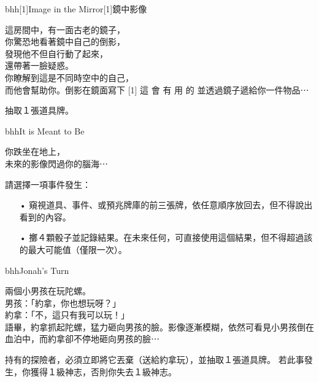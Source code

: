 \linebreak[0]%
\begin{EventCardSp}{bhh}{\scalebox{-1}[1]{Image in the Mirror}}{\scalebox{-1}[1]{鏡中影像}}
  \begin{CardStory}
    這房間中，有一面古老的鏡子，\\
    你驚恐地看著鏡中自己的倒影，\\
    發現他不但自行動了起來，\\
    還帶著一臉疑惑。\\
    你瞭解到這是不同時空中的自己，\\
    而他會幫助你。倒影在鏡面寫下\smallbreak
    \scalebox{-1}[1]{ \FontScript 這 \enskip 會 \enskip 有 \enskip 用 \enskip 的 }\smallbreak
    並透過鏡子遞給你一件物品⋯
\end{CardStory}
  抽取１張道具牌。\smallbreak
\end{EventCardSp}%
\linebreak[0]%
\begin{EventCard}{bhh}{It is Meant to Be}
  \begin{CardStory}
    你跌坐在地上，\\
    未來的影像閃過你的腦海⋯
  \end{CardStory}
  請選擇一項事件發生：
  \begin{itemize}
    \item[•] 窺視道具、事件、或預兆牌庫的前三張牌，依任意順序放回去，但不得說出看到的內容。
    \item[•] 擲４顆骰子並記錄結果。在未來任何\RollAny{}，可直接使用這個結果，但不得超過該\RollAny{}的最大可能值（僅限一次）。
  \end{itemize}
\end{EventCard}%
\linebreak[0]%
\begin{EventCard}{bhh}{Jonah’s Turn}
  \begin{CardStory}
    兩個小男孩在玩陀螺。\\
    男孩：「約拿，你也想玩呀？」\\
    約拿：「不，這只有我可以玩！」\\
    語畢，約拿抓起陀螺，猛力砸向男孩的臉。影像逐漸模糊，依然可看見小男孩倒在血泊中，而約拿卻不停地砸向男孩的臉⋯
\end{CardStory}
  持有的探險者，必須立即將它丟棄（送給約拿玩），並抽取１張道具牌。\smallbreak
  若此事發生，你獲得１級神志，否則你失去１級神志。\smallbreak
\end{EventCard}%
\linebreak[0]%
